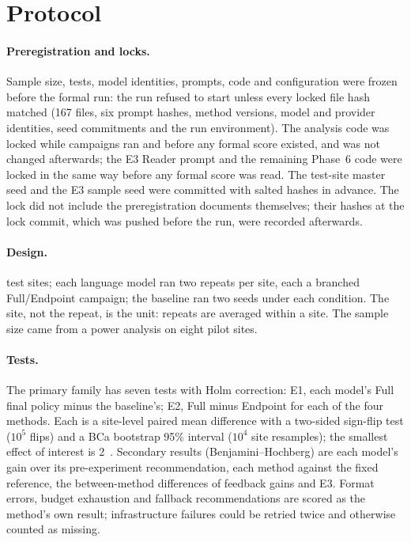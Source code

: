 \section{Protocol}
\paragraph{Preregistration and locks.} Sample size, tests, model identities, prompts, code and configuration were frozen before the formal run: the run refused to start unless every locked file hash matched (167 files, six prompt hashes, method versions, model and provider identities, seed commitments and the run environment). The analysis code was locked while campaigns ran and before any formal score existed, and was not changed afterwards; the E3 Reader prompt and the remaining Phase~6 code were locked in the same way before any formal score was read. The test-site master seed and the E3 sample seed were committed with salted hashes in advance. The lock did not include the preregistration documents themselves; their hashes at the lock commit, which was pushed before the run, were recorded afterwards.

\paragraph{Design.}  test sites; each language model ran two repeats per site, each a branched Full/Endpoint campaign; the baseline ran two seeds under each condition. The site, not the repeat, is the unit: repeats are averaged within a site. The sample size came from a power analysis on eight pilot sites.

\paragraph{Tests.} The primary family has seven tests with Holm correction: E1, each model's Full final policy minus the baseline's; E2, Full minus Endpoint for each of the four methods. Each is a site-level paired mean difference with a two-sided sign-flip test ($10^5$ flips) and a BCa bootstrap 95\% interval ($10^4$ site resamples); the smallest effect of interest is 2~\eur{}. Secondary results (Benjamini--Hochberg) are each model's gain over its pre-experiment recommendation, each method against the fixed reference, the between-method differences of feedback gains and E3. Format errors, budget exhaustion and fallback recommendations are scored as the method's own result; infrastructure failures could be retried twice and otherwise counted as missing.

